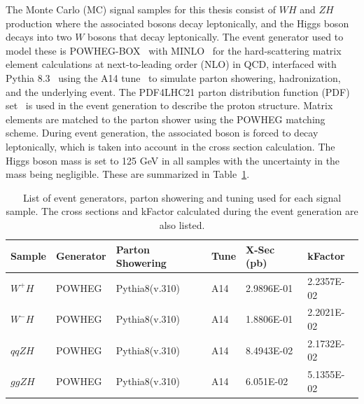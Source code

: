The Monte Carlo (MC) signal samples for this thesis consist of $WH$ and $ZH$ production where the associated bosons decay leptonically, and the Higgs boson decays into two $W$ bosons that decay leptonically. The event generator used to model these is POWHEG-BOX~\cite{powheg} with MINLO~\cite{minlo} for the hard-scattering matrix element calculations at next-to-leading order (NLO) in QCD, interfaced with Pythia 8.3~\cite{pythia8.3} using the A14 tune~\cite{ATL-PHYS-PUB-2014-021} to simulate parton showering, hadronization, and the underlying event. The PDF4LHC21 parton distribution function (PDF) set~\cite{PDF4LHCWorkingGroup_pdfsetrun3} is used in the event generation to describe the proton structure. Matrix elements are matched to the parton shower using the POWHEG matching scheme. During event generation, the associated boson is forced to decay leptonically, which is taken into account in the cross section calculation. The Higgs boson mass is set to 125 GeV in all samples with the uncertainty in the mass being negligible. These are summarized in Table~\ref{tab:mc_signal_samples}.

\begin{table}
  \centering
  \begin{tabular}{l|l|l|l|l|l}
    \hline
    Sample & Generator & Parton Showering & Tune & X-Sec (pb) & kFactor \\
    \hline
    $W^{+}H$ & POWHEG & Pythia8(v.310) & A14 & 2.9896E-01 & 2.2357E-02 \\
    $W^{-}H$ & POWHEG & Pythia8(v.310) & A14 & 1.8806E-01 & 2.2021E-02 \\
    $qqZH$ & POWHEG & Pythia8(v.310) & A14 & 8.4943E-02 & 2.1732E-02 \\
    $ggZH$ & POWHEG & Pythia8(v.310) & A14 & 6.051E-02 & 5.1355E-02 \\
    \hline
  \end{tabular}
  \caption{List of event generators, parton showering and tuning used for each signal sample. The cross sections and kFactor calculated during the event generation are also listed.}\label{tab:mc_signal_samples}
\end{table}